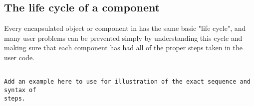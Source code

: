 \subsection{The life cycle of a component}

Every encapsulated object or component in \hypre{} has the same basic "life
cycle", and many user 
problems can be prevented simply by understanding this cycle and making sure
that each component has 
had all of the proper steps taken in the user code.

\begin{display}
\begin{verbatim}

Add an example here to use for illustration of the exact sequence and syntax of
steps.

\end{verbatim}
\end{display}

